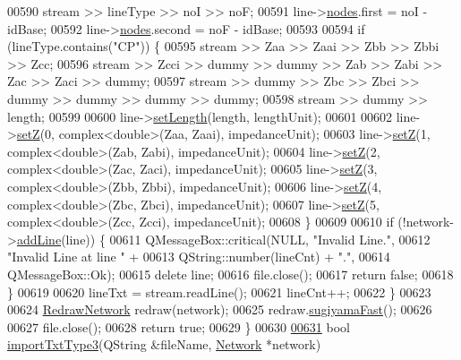 \begin{DoxyCode}
00590     stream >> lineType >> noI >> noF;
00591     line->\hyperlink{class_line_afd17c40d656e6a8d677cb22df5f0c70b}{nodes}.first = noI - idBase;
00592     line->\hyperlink{class_line_afd17c40d656e6a8d677cb22df5f0c70b}{nodes}.second = noF - idBase;
00593 
00594     \textcolor{keywordflow}{if} (lineType.contains(\textcolor{stringliteral}{"CP"})) \{
00595       stream >> Zaa >> Zaai >> Zbb >> Zbbi >> Zcc;
00596       stream >> Zcci >> dummy >> dummy >> Zab >> Zabi >> Zac >> Zaci >> dummy;
00597       stream >> dummy >> Zbc >> Zbci >> dummy >> dummy >> dummy >> dummy;
00598       stream >> dummy >> length;
00599 
00600       line->\hyperlink{group___models_ga950d0b8f5d167eda430c65ca7adadbb0}{setLength}(length, lengthUnit);
00601 
00602       line->\hyperlink{group___models_ga409df7d11f5c5d594a13fb2f74b3b9e0}{setZ}(0, complex<double>(Zaa, Zaai), impedanceUnit);
00603       line->\hyperlink{group___models_ga409df7d11f5c5d594a13fb2f74b3b9e0}{setZ}(1, complex<double>(Zab, Zabi), impedanceUnit);
00604       line->\hyperlink{group___models_ga409df7d11f5c5d594a13fb2f74b3b9e0}{setZ}(2, complex<double>(Zac, Zaci), impedanceUnit);
00605       line->\hyperlink{group___models_ga409df7d11f5c5d594a13fb2f74b3b9e0}{setZ}(3, complex<double>(Zbb, Zbbi), impedanceUnit);
00606       line->\hyperlink{group___models_ga409df7d11f5c5d594a13fb2f74b3b9e0}{setZ}(4, complex<double>(Zbc, Zbci), impedanceUnit);
00607       line->\hyperlink{group___models_ga409df7d11f5c5d594a13fb2f74b3b9e0}{setZ}(5, complex<double>(Zcc, Zcci), impedanceUnit);
00608     \}
00609 
00610     \textcolor{keywordflow}{if} (!network->\hyperlink{group___graphics_gae02945131494987b3ff9b59b627719b4}{addLine}(line)) \{
00611       QMessageBox::critical(NULL, \textcolor{stringliteral}{"Invalid Line."},
00612                             \textcolor{stringliteral}{"Invalid Line at line "} +
00613                             QString::number(lineCnt) + \textcolor{stringliteral}{"."},
00614                             QMessageBox::Ok);
00615       \textcolor{keyword}{delete} line;
00616       file.close();
00617       \textcolor{keywordflow}{return} \textcolor{keyword}{false};
00618     \}
00619 
00620     lineTxt = stream.readLine();
00621     lineCnt++;
00622   \}
00623 
00624   \hyperlink{class_redraw_network}{RedrawNetwork} redraw(network);
00625   redraw.\hyperlink{class_redraw_network_a94d53ddf8ee00c4ef6d56bb988333103}{sugiyamaFast}();
00626 
00627   file.close();
00628   \textcolor{keywordflow}{return} \textcolor{keyword}{true};
00629 \}
00630 
\hypertarget{import_8cpp_source_l00631}{}\hyperlink{import_8h_acd1a54d4b2a28043b1489f0be7423ecd}{00631} \textcolor{keywordtype}{bool} \hyperlink{import_8cpp_acd1a54d4b2a28043b1489f0be7423ecd}{importTxtType3}(QString &fileName, \hyperlink{class_network}{Network} *network)

\end{DoxyCode}
